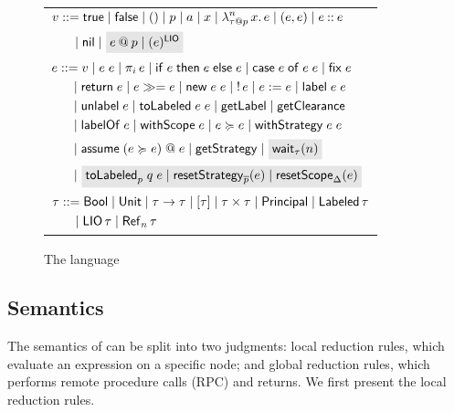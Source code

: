 \begin{figure}
    \centering
    \begin{tabular}{l}
         $\begin{aligned}[t]
         \val &::= \true \mid \false \mid () \mid p \mid \addr \mid x \mid \abs{n}{\lb{p}{\type}}{x}{\expr} \mid (\expr, \expr) \mid \cons{\expr}{\expr} \\
         &\quad \mid \nil \mid \graybox{\lb{p}{\expr} \mid \lio{\expr}}
         \end{aligned}$ \\
         $\begin{aligned}[t]
         \expr &::= \val \mid \app{\expr}{\expr} \mid \proj{i}{\expr} \mid \ifexpr{\expr}{\expr}{\expr} \mid \case{\expr}{\expr}{\expr} \mid \fix{\expr} \\ &\quad \mid \return{\expr} \mid \bind{\expr}{\expr} \mid
         \new{\expr}{\expr} \mid \readref{\expr} \mid \writeref{\expr}{\expr} \mid \Label{\expr}{\expr} \\ &\quad
         \mid \unlabel{\expr} \mid
         \tolabeled{\expr}{\expr} \mid \getlabel \mid \getclearance \\ &\quad
         \mid \labelof{\expr} \mid \withscope{\expr} \mid \expr \actsfor \expr \mid \withstrategy{\expr}{\expr} \\ &\quad \mid \adddelegate{\expr}{\expr}{\expr} \mid \getstrategy
         \mid \graybox{\wait{n}[\type]} \\ &\quad
         \mid \graybox{\internalTolabeled{p}{q}{\expr} \mid \resetstrategy{\overline{p}}{\expr} \mid \resetscope{\scope}{\expr}}
         \end{aligned}$ \\
         $\begin{aligned}[t]
         \type &::= \bool \mid \unit \mid \func{\type}{\type} \mid \listtype{\type} \mid \pair{\type}{\type} \mid \labeltype \mid \labeled{\type} \\ &\quad
         \mid \liotype{\type} \mid \reftype[n]{\type}
         \end{aligned}$
    \end{tabular}
    \caption{The \lang{} language}
    \label{fig:language-syntax}
\end{figure}

\subsection{Semantics}\label{sec:semantics}
The semantics of \lang{} can be split into two judgments: local reduction rules, which evaluate an expression on a specific node; and global reduction rules, which performs remote procedure calls (RPC) and returns. We first present the local reduction rules.

